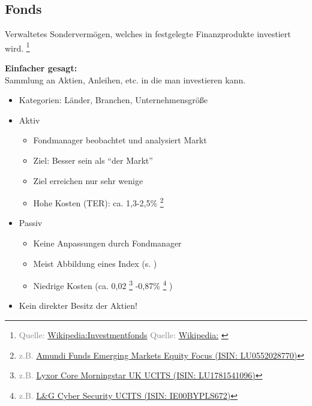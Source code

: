 \documentclass{beamer}
\let\oldfootnote\footnote
\renewcommand{\footnote}[1]
{%
	\oldfootnote
	{
		\tiny
		\textcolor{gray}{#1}
	}%
}
\newcommand{\citewiki}[2][]
{%
	\footnote
	{
		\ifthenelse{\isempty{#1}}
		{
			Quelle: \href{https://de.wikipedia.org/wiki/#2}{Wikipedia:#2}
		}
		{
			Quelle: \href{https://de.wikipedia.org/wiki/#2}{Wikipedia:#1}
		}
	}
}
\begin{document}
		\subsection{Fonds}
		
			\begin{frame}
				\begin{definition}
					Verwaltetes Sondervermögen, welches in festgelegte Finanzprodukte investiert wird.\citewiki{Investmentfonds}
				\end{definition}\hfill
			
				\textbf{Einfacher gesagt:}\\
				Sammlung an Aktien, Anleihen, etc. in die man investieren kann.
			\end{frame}
		
			\begin{frame}
				\begin{itemize}
					\item Kategorien: Länder, Branchen, Unternehmensgröße\pause
					\item Aktiv
					\begin{itemize}
						\item Fondmanager beobachtet und analysiert Markt
						\item Ziel: Besser sein als "`der Markt"'
						\item Ziel erreichen nur sehr wenige
						\item Hohe Kosten (TER): ca. 1,3-2,5\%\footnote{z.B. \href{https://www.comdirect.de/inf/fonds/LU0552028770}{Amundi Funds Emerging Markets Equity Focus (ISIN: LU0552028770)}}
					\end{itemize}\pause
					\item Passiv\pause
					\begin{itemize}
						\item Keine Anpassungen durch Fondmanager
						\item Meist Abbildung eines Index (s. \nameref{subsec:etfs})
						\item Niedrige Kosten (ca. 0,02\footnote{z.B. \href{https://de.extraetf.com/etf-profile/LU1781541096}{Lyxor Core Morningstar UK UCITS (ISIN: LU1781541096)}}-0,87\%\footnote{z.B. \href{https://de.extraetf.com/etf-profile/IE00BYPLS672}{L\&G Cyber Security UCITS (ISIN: IE00BYPLS672)}})
					\end{itemize}\pause
					\item Kein direkter Besitz der Aktien!
				\end{itemize}
			\end{frame}
		
\end{document}
